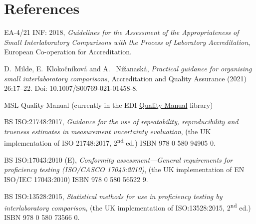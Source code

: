 \section{References}

\begingroup
\renewcommand{\section}[2]{}%

\begin{thebibliography}{99}
 EA-4/21 INF: 2018, \textit{Guidelines for the Assessment of the Appropriateness of Small Interlaboratory Comparisons with the Process of Laboratory Accreditation}, European Co-operation for Accreditation.

 D.~Milde, E.~Kloko\u{c}n\'ikov\'a and A.~ Ni\u{z}anask\'a, \textit{Practical guidance for organising small interlaboratory comparisons}, Accreditation and Quality Assurance (2021) 26:17--22. Doi: 10.1007/S00769-021-01458-8.

 MSL Quality Manual (currently in the EDI \href{https://edi.callaghaninnovation.govt.nz/ws/msl/QMS/QM?Web=1}{Quality Manual} library)

 BS ISO:21748:2017, \textit{Guidance for the use of repeatability, reproducibility and trueness estimates in measurement uncertainty evaluation}, (the UK implementation of ISO 21748:2017, 2\textsuperscript{nd} ed.)  ISBN 978 0 580 94905 0.

 BS ISO:17043:2010 (E), \textit{Conformity assessment---General requirements for proficiency testing (ISO/CASCO 17043:2010)}, (the UK implementation of EN ISO/IEC 17043:2010) ISBN 978 0 580 56522 9.

 BS ISO:13528:2015, \textit{Statistical methods for use in proficiency testing by interlaboratory comparison}, (the UK implementation of ISO:13528:2015, 2\textsuperscript{nd} ed.) ISBN 978 0 580 73566 0.

\end{thebibliography}
\endgroup

